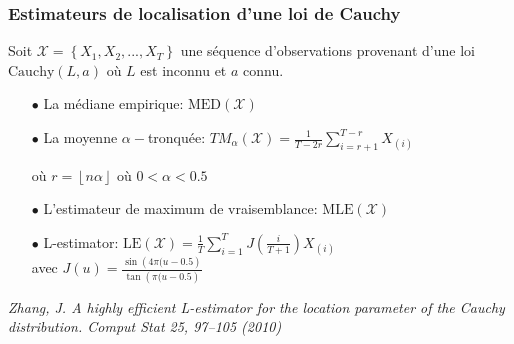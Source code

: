 \documentclass[8pt, sans]{beamer}
\begin{document}
\begin{frame}

\frametitle{Estimateurs de localisation d'une loi de Cauchy}

Soit $\mathcal{X}=\left\{X_1,X_2,...,X_T\right\}$ une séquence d'observations provenant d'une loi $\mathrm{Cauchy}(L,a)$ où $L$ est inconnu et $a$ connu.

\vfill
\pause

\begin{itemize}

\vfill
\item[$\bullet$]
La médiane empirique: $\mathrm{MED}(\mathcal{X})$

\pause
\vfill
\item[$\bullet$]
La moyenne $\alpha-$tronquée: $\displaystyle TM_{\alpha}(\mathcal X)=\frac{1}{T-2r}\sum_{i=r+1}^{T-r}X_{(i)}$

où $r=\left\lfloor n\alpha\right\rfloor$ où $0<\alpha<0.5$ 

\pause
\vfill
\item[$\bullet$]
L'estimateur de maximum de vraisemblance: $\mathrm{MLE}(\mathcal{X})$

\pause
\vfill
\item[$\bullet$]
L-estimator: $\displaystyle\mathrm{LE}(\mathcal{X})=\frac{1}{T}\sum_{i=1}^T J\left(\frac{i}{T+1}\right) X_{(i)}$\\
avec $J(u)=\frac{\sin\left(4\pi(u-0.5\right)}{\tan\left(\pi(u-0.5\right)}$

\end{itemize}

\pause
\vfill

{\it Zhang, J. A highly efficient L-estimator for the location parameter of the Cauchy distribution. Comput Stat 25, 97–105 (2010)}

\end{frame}
\end{document}
